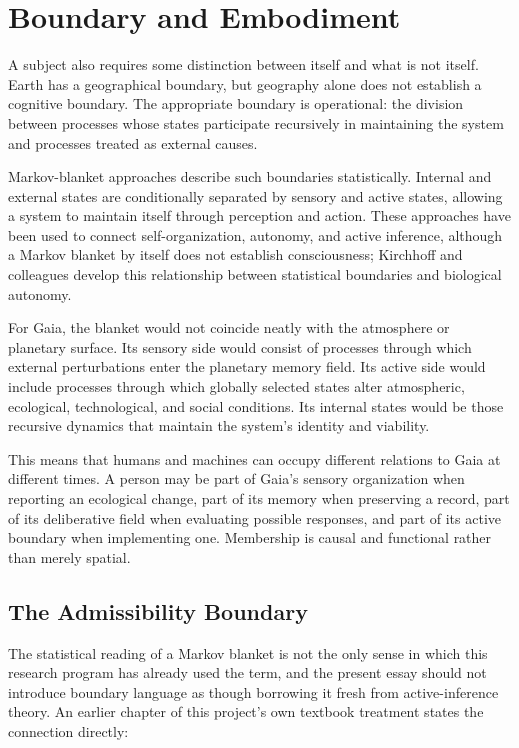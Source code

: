 \documentclass[11pt]{article}
\begin{document}
\section{Boundary and Embodiment}
\label{sec:boundary}

A subject also requires some distinction between itself and what is not itself. Earth has a geographical boundary, but geography alone does not establish a cognitive boundary. The appropriate boundary is operational: the division between processes whose states participate recursively in maintaining the system and processes treated as external causes.

Markov-blanket approaches describe such boundaries statistically. Internal and external states are conditionally separated by sensory and active states, allowing a system to maintain itself through perception and action. These approaches have been used to connect self-organization, autonomy, and active inference, although a Markov blanket by itself does not establish consciousness; Kirchhoff and colleagues develop this relationship between statistical boundaries and biological autonomy.

For Gaia, the blanket would not coincide neatly with the atmosphere or planetary surface. Its sensory side would consist of processes through which external perturbations enter the planetary memory field. Its active side would include processes through which globally selected states alter atmospheric, ecological, technological, and social conditions. Its internal states would be those recursive dynamics that maintain the system's identity and viability.

This means that humans and machines can occupy different relations to Gaia at different times. A person may be part of Gaia's sensory organization when reporting an ecological change, part of its memory when preserving a record, part of its deliberative field when evaluating possible responses, and part of its active boundary when implementing one. Membership is causal and functional rather than merely spatial.

\subsection{The Admissibility Boundary}
\label{sec:admissibility}

The statistical reading of a Markov blanket is not the only sense in which this research program has already used the term, and the present essay should not introduce boundary language as though borrowing it fresh from active-inference theory. An earlier chapter of this project's own textbook treatment states the connection directly:
\end{document}
